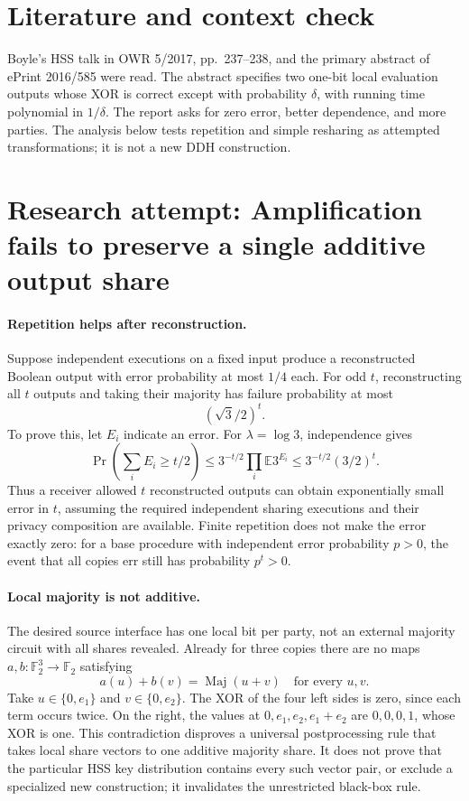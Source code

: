 \documentclass[11pt]{article}
\begin{document}
\section{Literature and context check}
Boyle's HSS talk in OWR 5/2017, pp.~237--238, and the primary abstract of ePrint 2016/585 were read. The abstract specifies two one-bit local evaluation outputs whose XOR is correct except with probability $\delta$, with running time polynomial in $1/\delta$. The report asks for zero error, better dependence, and more parties. The analysis below tests repetition and simple resharing as attempted transformations; it is not a new DDH construction.
\section{Research attempt: Amplification fails to preserve a single additive output share}

\paragraph{Repetition helps after reconstruction.}
Suppose independent executions on a fixed input produce a reconstructed Boolean output with error probability at most $1/4$ each. For odd $t$, reconstructing all $t$ outputs and taking their majority has failure probability at most
\[
 (\sqrt3/2)^t.
\]
To prove this, let $E_i$ indicate an error. For $\lambda=\log3$, independence gives
\[
 \Pr\left(\sum_iE_i\ge t/2\right)
 \le 3^{-t/2}\prod_i\mathbb E3^{E_i}
 \le3^{-t/2}(3/2)^t.
\]
Thus a receiver allowed $t$ reconstructed outputs can obtain exponentially small error in $t$, assuming the required independent sharing executions and their privacy composition are available. Finite repetition does not make the error exactly zero: for a base procedure with independent error probability $p>0$, the event that all copies err still has probability $p^t>0$.

\paragraph{Local majority is not additive.}
The desired source interface has one local bit per party, not an external majority circuit with all shares revealed. Already for three copies there are no maps $a,b:\mathbb F_2^3\to\mathbb F_2$ satisfying
\[
 a(u)+b(v)=\operatorname{Maj}(u+v)\quad\text{for every }u,v.
\]
Take $u\in\{0,e_1\}$ and $v\in\{0,e_2\}$. The XOR of the four left sides is zero, since each term occurs twice. On the right, the values at $0,e_1,e_2,e_1+e_2$ are $0,0,0,1$, whose XOR is one. This contradiction disproves a universal postprocessing rule that takes local share vectors to one additive majority share. It does not prove that the particular HSS key distribution contains every such vector pair, or exclude a specialized new construction; it invalidates the unrestricted black-box rule.
\end{document}
